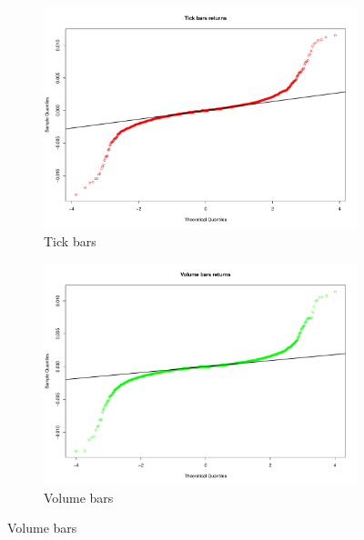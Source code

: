 \begin{figure}[htbp]
	\centering

	\begin{subfigure}{.5\textwidth}
		\centering
		\includegraphics[scale=.25]{img/dataBars/tickQQPlot}
		\caption{Tick bars}
	\end{subfigure}%
	\begin{subfigure}{.5\textwidth}
		\centering
		\includegraphics[scale=.25]{img/dataBars/volumeQQPlot}
		\caption{Volume bars}
	\end{subfigure}%

	\vspace{.4cm}


\end{figure}
